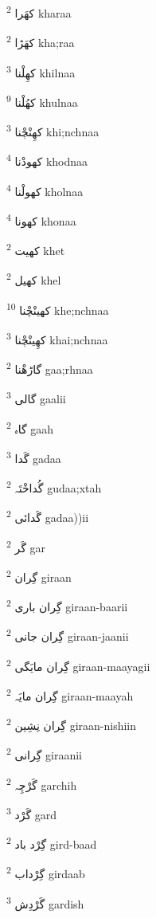 \documentclass[12pt]{article}
\begin{document}
\begin{multicols}{5}
{\ur کھَرا}   \textsuperscript{2} kharaa

{\ur کھَڑا}   \textsuperscript{2} kha;raa

{\ur کھِلْنا}   \textsuperscript{3} khilnaa

{\ur کھُلْنا}   \textsuperscript{9} khulnaa

{\ur کھِنْچْنا}   \textsuperscript{3} khi;nchnaa

{\ur کھودْنا}   \textsuperscript{4} khodnaa

{\ur کھولْنا}   \textsuperscript{4} kholnaa

{\ur کھونا}   \textsuperscript{4} khonaa

{\ur کھیت}   \textsuperscript{2} khet

{\ur کھیل}   \textsuperscript{2} khel

{\ur کھینْچْنا}   \textsuperscript{10} khe;nchnaa

{\ur کھِینْچْنا}   \textsuperscript{3} khai;nchnaa

{\ur گاڑھْنا}   \textsuperscript{2} gaa;rhnaa

{\ur گالی}   \textsuperscript{3} gaalii

{\ur گاہ}   \textsuperscript{2} gaah

{\ur گَدا}   \textsuperscript{3} gadaa

{\ur گُداخْتَہ}   \textsuperscript{2} gudaa;xtah

{\ur گَدائی}   \textsuperscript{2} gadaa))ii

{\ur گَر}   \textsuperscript{2} gar

{\ur گِران}   \textsuperscript{2} giraan

{\ur گِران باری}   \textsuperscript{2} giraan-baarii

{\ur گِران جانی}   \textsuperscript{2} giraan-jaanii

{\ur گِران مایَگی}   \textsuperscript{2} giraan-maayagii

{\ur گِران مایَہ}   \textsuperscript{2} giraan-maayah

{\ur گِران نِشِین}   \textsuperscript{2} giraan-nishiin

{\ur گِرانی}   \textsuperscript{2} giraanii

{\ur گَرْچِہ}   \textsuperscript{2} garchih

{\ur گَرْد}   \textsuperscript{3} gard

{\ur گِرْد باد}   \textsuperscript{2} gird-baad

{\ur گِرْداب}   \textsuperscript{2} girdaab

{\ur گَرْدِش}   \textsuperscript{3} gardish


\end{multicols}
\end{document}
